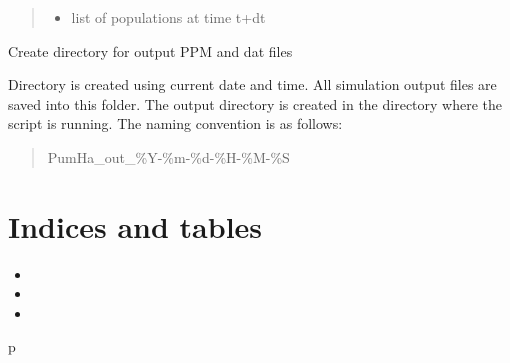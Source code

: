 \documentclass[letterpaper,10pt,english]{sphinxmanual}
\begin{document}
\begin{fulllineitems}
\begin{fulllineitems}
\begin{quote}
\begin{description}
\begin{itemize}
\item {} 
 \textendash{} list of populations at time t+dt

\end{itemize}

\end{description}\end{quote}

\end{fulllineitems}


\end{fulllineitems}


\begin{fulllineitems}
\label{\detokenize{pumha:pumha.sim.create_output_dir}}
Create directory for output PPM and dat files

Directory is created using current date and time. All simulation output
files are saved into this folder. The output directory is created in the
directory where the script is running. The naming convention is as follows:
\begin{quote}

PumHa\_out\_\%Y-\%m-\%d-\%H-\%M-\%S
\end{quote}

\end{fulllineitems}



\chapter{Indices and tables}
\label{\detokenize{index:indices-and-tables}}\begin{itemize}
\item {} 

\item {} 

\item {} 

\end{itemize}


\renewcommand{\indexname}{Python Module Index}
\begin{sphinxtheindex}
\def\bigletter#1{{\Large\sffamily#1}\nopagebreak\vspace{1mm}}
\bigletter{p}
\item {}
\item {}
\item {}
\item {}
\end{sphinxtheindex}

\renewcommand{\indexname}{Index}
\printindex
\end{document}
